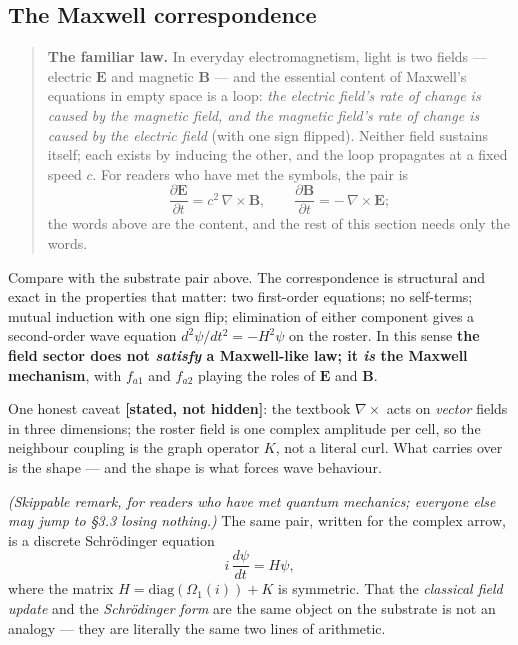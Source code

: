 \subsection{The Maxwell
correspondence}\label{the-maxwell-correspondence}

\begin{quote}
\textbf{The familiar law.} In everyday electromagnetism, light is two
fields --- electric \(\mathbf{E}\) and magnetic \(\mathbf{B}\) --- and
the essential content of Maxwell's equations in empty space is a loop:
\emph{the electric field's rate of change is caused by the magnetic
field, and the magnetic field's rate of change is caused by the electric
field} (with one sign flipped). Neither field sustains itself; each
exists by inducing the other, and the loop propagates at a fixed speed
\(c\). For readers who have met the symbols, the pair is
\[\frac{\partial \mathbf{E}}{\partial t} = c^2\,\nabla\times\mathbf{B},
  \qquad
  \frac{\partial \mathbf{B}}{\partial t} = -\,\nabla\times\mathbf{E};\]
the words above are the content, and the rest of this section needs only
the words.
\end{quote}

Compare with the substrate pair above. The correspondence is structural
and exact in the properties that matter: two first-order equations; no
self-terms; mutual induction with one sign flip; elimination of either
component gives a second-order wave equation \(d^2\psi/dt^2 = -H^2\psi\)
on the roster. In this sense \textbf{the field sector does not
\emph{satisfy} a Maxwell-like law; it \emph{is} the Maxwell mechanism},
with \(f_{a1}\) and \(f_{a2}\) playing the roles of \(\mathbf{E}\) and
\(\mathbf{B}\).

One honest caveat \textbf{{[}stated, not hidden{]}}: the textbook
\(\nabla\times\) acts on \emph{vector} fields in three dimensions; the
roster field is one complex amplitude per cell, so the neighbour
coupling is the graph operator \(K\), not a literal curl. What carries
over is the shape --- and the shape is what forces wave behaviour.

\emph{(Skippable remark, for readers who have met quantum mechanics;
everyone else may jump to §3.3 losing nothing.)} The same pair, written
for the complex arrow, is a discrete Schrödinger equation
\[i\,\frac{d\psi}{dt} = H\psi,\] where the matrix
\(H = \mathrm{diag}(\Omega_1(i)) + K\) is symmetric. That the
\emph{classical field update} and the \emph{Schrödinger form} are the
same object on the substrate is not an analogy --- they are literally
the same two lines of arithmetic.

